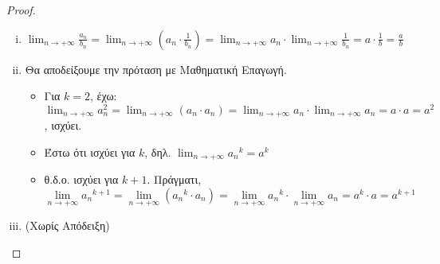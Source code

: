\documentclass[main.tex]{subfiles}
\begin{document}
\begin{proof}
\begin{enumerate}[i)]






    \item 
      $ \lim_{n \to +\infty} \frac{a_{n}}{b_{n}} = 
      \lim_{n \to +\infty} \left(a_{n}\cdot \frac{1}{b_{n}}
      \right) = \lim_{n \to +\infty} a_{n} \cdot \lim_{n \to +\infty} 
      \frac{1}{b_{n}} = a \cdot \frac{1}{b} = \frac{a}{b}$

    \item 
      Θα αποδείξουμε την πρόταση με Μαθηματική Επαγωγή.
      \begin{itemize}
        \item Για $ k=2 $, έχω: $ \lim_{n \to +\infty} 
          a_{n}^{2} = \lim_{n \to
          +\infty} (a_{n} \cdot a_{n}) = 
          \lim_{n \to +\infty} a_{n} \cdot 
          \lim_{n \to +\infty}
          a_{n} =  a \cdot a = a^{2}  $, ισχύει.
        \item Έστω ότι ισχύει για $k$, δηλ. $ 
          \lim_{n \to +\infty} {a_{n}}^{k} = a^{k}  $
        \item θ.δ.ο. ισχύει για $ k+1 $. Πράγματι, 
          \[
            \lim_{n \to +\infty} {a_{n}}^{k+1}= 
            \lim_{n \to +\infty} ({a_{n}}^{k} \cdot a_{n})  
            = \lim_{n \to +\infty} {a_{n}}^{k} \cdot 
            \lim_{n \to +\infty} a_{n} = a^{k} \cdot a = 
            a^{k+1}
          \] 
      \end{itemize}

    \item (Χωρίς Απόδειξη)
  \end{enumerate}
\end{proof}
\end{document}
